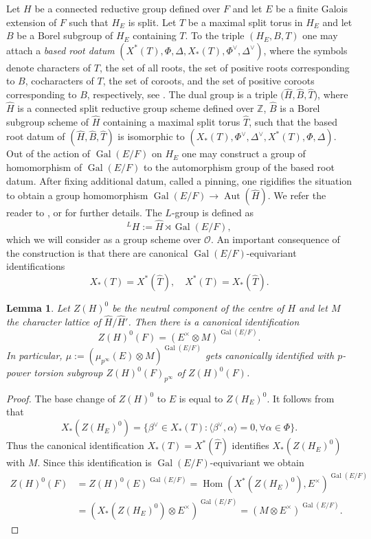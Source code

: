\documentclass{amsart}
\newtheorem{lem}[prop]{Lemma}
\theoremstyle{definition}
\theoremstyle{remark}
\DeclareMathOperator{\Aut}{Aut}
\DeclareMathOperator{\Hom}{Hom}
\DeclareMathOperator{\Gal}{Gal}
\newcommand{\ZZ}{\mathbb Z}
\newcommand{\OO}{\mathcal O}
\begin{document}
Let $H$ be a connected reductive 
group defined over $F$ and let $E$ be a finite Galois extension of $F$ such that $H_E$ is split. Let $T$ be a 
maximal split torus in $H_E$ and let $B$ be a Borel subgroup of $H_E$ containing 
$T$. To the triple $(H_E, B, T)$ one may attach a \emph{based root datum} 
$(X^{\ast}(T), \Phi, \Delta, X_{\ast}(T), \Phi^{\vee}, \Delta^{\vee})$, 
where the symbols denote characters of $T$, the set of all roots, the 
set of positive roots corresponding to $B$, cocharacters of $T$, the set 
of coroots, and the set of positive coroots corresponding to $B$, respectively,
see \cite[Section 1.5]{bcnrd}. 
The dual group is a triple $(\widehat{H}, \widehat{B}, \widehat{T}$), where 
$\widehat{H}$ is a connected split reductive group scheme defined over $\ZZ$, $\widehat{B}$ 
is a Borel subgroup scheme of $\widehat{H}$ containing a maximal split 
torus $\widehat{T}$, such that the based root datum of $(\widehat{H}, \widehat{B}, \widehat{T})$ is isomorphic to $(X_{\ast}(T), \Phi^{\vee}, \Delta^{\vee}, X^{\ast}(T), \Phi, \Delta)$. Out of the action of $\Gal(E/F)$ 
on $H_E$ one may construct a group of homomorphism of $\Gal(E/F)$ 
to the automorphism group of the based root datum. After fixing additional 
datum, called a pinning, one rigidifies the situation to obtain a group homomorphism 
$\Gal(E/F)\rightarrow \Aut(\widehat{H})$. We refer the reader to 
\cite[Section I.1]{borel_corvallis}, or \cite[Section 2]{DPS} for further details. The $L$-group 
is defined as 
$${}^L H:= \widehat{H}\rtimes \Gal(E/F),$$
which we will consider as a group scheme over $\OO$. An important
consequence of the construction is that there are canonical $\Gal(E/F)$-equivariant identifications
$$X_{\ast}(T)=X^{\ast}(\widehat{T}), \quad X^{\ast}(T)=X_{\ast}(\widehat{T}).$$




\begin{lem}\label{char_cochar} Let $Z(H)^0$ be the neutral component of the centre of $H$ and let $M$ the character lattice 
of $\widehat{H}/\widehat{H}'$. Then there is a canonical identification 
$$Z(H)^0(F)=(E^{\times} \otimes M)^{\Gal(E/F)}.$$
In particular, $\mu:=(\mu_{p^{\infty}}(E) \otimes M)^{\Gal(E/F)}$ gets canonically identified with $p$-power torsion subgroup $Z(H)^0(F)_{p^{\infty}}$ of $Z(H)^0(F)$.
\end{lem}
\begin{proof} The base change of $Z(H)^0$ to $E$ is equal to $Z(H_E)^0$. 
It follows from \cite[Proposition 14.2]{borel} that 
$$ X_{\ast}(Z(H_E)^0)=\{ \beta^{\vee}\in X_{\ast}(T): \langle \beta^{\vee}, \alpha\rangle=0, \forall \alpha\in \Phi\}.$$  
Thus the canonical identification $X_{\ast}(T)=X^{\ast}(\widehat{T})$ identifies $X_{\ast}(Z(H_E)^0)$ with $M$. Since
this identification is $\Gal(E/F)$-equivariant we obtain
\begin{equation}
\begin{split}
 Z(H)^0(F)&=Z(H)^0(E)^{\Gal(E/F)}=\Hom(X^{\ast}(Z(H_E)^0), E^{\times})^{\Gal(E/F)}\\
 &= (X_{\ast}(Z(H_E)^0)\otimes E^{\times})^{\Gal(E/F)}= (M\otimes E^{\times})^{\Gal(E/F)}.
 \end{split}
 \end{equation}
\end{proof}
\end{document}
